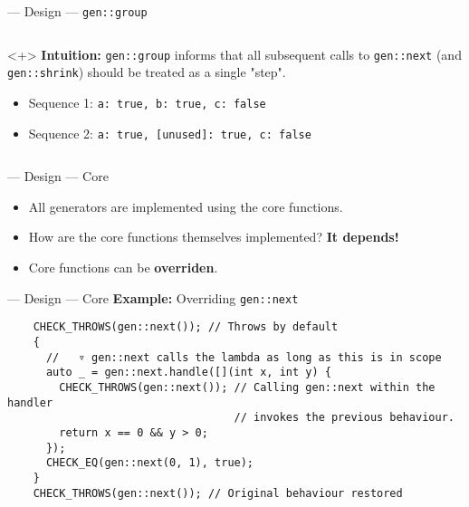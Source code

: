 \begin{frame}[fragile,t]{\halcheck{} --- Design --- \texttt{gen::group}}
\begin{columns}[T]
    \begin{onlyenv}<+>
      \textbf{Intuition:} \texttt{gen::group} informs \halcheck{} that all subsequent calls to \texttt{gen::next} (and \texttt{gen::shrink}) should be treated as a single "step".

      \begin{itemize}
        \item Sequence 1: \texttt{{{a: true, b: true}, c: false}}
        \item Sequence 2: \texttt{{{a: true, [unused]: true}, c: false}}
      \end{itemize}
    \end{onlyenv}
  \end{columns}
\end{frame}

\begin{frame}[fragile]{\halcheck{} --- Design --- Core}
  \begin{itemize}
    \item All generators are implemented using the core functions.
          \pause{}
    \item How are the core functions themselves implemented?
          \pause\textbf{It depends!}
    \item Core functions can be \textbf{overriden}.
  \end{itemize}
\end{frame}

\begin{frame}[fragile]{\halcheck{} --- Design --- Core}
  \textbf{Example:} Overriding \texttt{gen::next}
  \begin{verbatim}
    CHECK_THROWS(gen::next()); // Throws by default
    {
      //   ▿ gen::next calls the lambda as long as this is in scope
      auto _ = gen::next.handle([](int x, int y) {
        CHECK_THROWS(gen::next()); // Calling gen::next within the handler
                                   // invokes the previous behaviour.
        return x == 0 && y > 0;
      });
      CHECK_EQ(gen::next(0, 1), true);
    }
    CHECK_THROWS(gen::next()); // Original behaviour restored
  \end{verbatim}
\end{frame}


